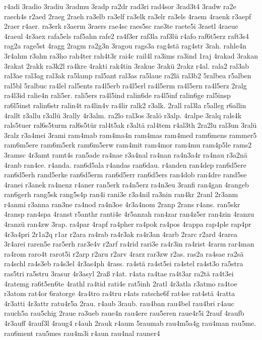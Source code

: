 {r4adi
3radio
3radiu
3radmu
3radp
ra2dr
rad3ri
rad4sor
3rad3t4
3radw
ra2e
raech4s
r2aed
2raeg
2raeh
ra3elb
ra3elf
ra3elk
ra3elr
ra3els
4raem
4raenk
r3aepf
2raer
r4aer.
ra3erk
r3aerm
3raers
rae4sc
raes5sc
rae3te
raete5i
3raetl
4raeue
4raeul
4r3aex
rafa5els
raf5ahn
rafe2
ra4f3er
raf3la
raf3lü
r4afo
raf6t5erz
raft3s4
rag2a
rage5st
4ragg
2ragm
ra2g3n
3ragou
rags3a
rag4stä
rag4str
3rah.
rahle4n
3r4ahm
r3ahn
ra3ho
rah4ter
rah4t3r
rai4c
rail4l
ra3ims
ra3ind
1raj
4rakad
3rakan
3rakat
2rakk
ra3k2l
ra4kre
4rakti
rak4tin
3rakue
3rakü
2rakz
r4al.
rala2
ral3ab
ral3ae
ral3ag
ral3ak
ra5lamp
ral5ant
ral3as
ra5laue
ra2lä
ral3b2
5ralbea
r5alben
ral5bl
5ralbuc
ra4lel
ral5ents
ra4l5erb
ra4l5erl
ra4l5erm
ra4l5ern
ra4l5erz
2ralg
ra4l3id
ralie4n
rali5er.
rali5ers
ra4l5ind
ralin6de
ra4l5inf
ralin6ge
ral5insp
ra6l5inst
ralin6str
ralin4t
ra4lin4v
ra4lir
ralk2
r3alk.
2rall
ral3la
r5alleg
r6allin
4rallt
r3allu
r3allü
3rally
4r3alm.
ra2lo
ral3os
3ralö
r3alp.
4ralpe
3ralq
rals4k
rals5tuer
ral6s5turm
ral6s5tür
ral4t5ak
r3altä
ral4tem
r4al3th
2ra2lu
ral3un
3ralü
3ralz
r3a4mei
3rami
ram4mab
ram4ma4n
ram4mas
ram4med
ram6mens
rammer5
ram6m5ere
ram6m5erk
ram6m5erw
ram4mit
ram4mor
ram4mu
ram4p5le
rams2
3ramsc
4r3amt
ramt4s
ran5ade
ra4nae
r3a4nal
ra4nan
ra4n3a4r
ra4nau
r3a2nä
4ranb
ran4ce.
r4anda.
ran6d5ala
r4andas
ran6dau.
r4anden
ran4dep
ran6d5ere
ran6d5erh
rand5erke
ran6d5erm
ran6d5err
ran6d5ers
ran4dob
ran4dre
rand5se
4ranei
r3anek
ra4nenz
r4aner
ran5erk
ra4n5erz
ra4n3eu
3ranfi
ran4gan
4rangeb
ran6gerh
rang5sk
rang5s4p
ran4i
rani3e
r3a4nil
ra3nin
ran4kr
2ranl
2r3anm
r4anmi
r3anna
ran3ne
ra4nod
ra4n3oe
4r3a4nom
2ranp
2rans
r4ans.
ran5skr
4ransp
ran4spa
4ranst
r5anthr
ranti4e
4r5anzah
ran4zar
ran4z5er
ran4zin
4ranzu
4ranzü
ran4zw
3rap.
ra4par
4rapf
ra4pher
ra4pok
ra4pos
4rappa
rap4ple
rap4pr
4r3a4pri
2r1a2q
r1ar
r2ara
ra4rab
ra4r3ak
ra4r3an
4rarb
2rarc
r2ard
4rarea
3r4arei
raren5e
rar5erh
rar3e4v
r2arf
ra4rid
rari3e
ra4r3in
ra4rist
4rarm
rar4man
ra4rom
raro4t
rarot5i
r2arp
r2aru
r2arv
4rarz
rar3zw
r2as.
ras2a
ra4sae
ra2sä
ra4schl
ra4s3eb
ra4s3el
4r3as4ph
4rass.
ra4stä
ra4st5ei
ra4stel
ra4st3o
ra5stra
ras5tri
ra5stru
3rasur
4r3asyl
2raß
r4at.
r4ata
ra4tae
ra4t3ar
ra2tä
ra4t3ei
4ratemg
ra6t5en6te
4rathl
ra4tid
rati4e
rat5inh
2ratl
4r3atla
r3atmo
ra4toe
r3atom
rat4or
6ratorge
4ra4tro
ra4tru
r4ats
ratsche6f
rat4se
rat4stä
4ratta
4r3atti
4r3attr
ratu4r5a
2rau.
r4aub
3raub.
rau4ban
rau4bel
rau4bri
r4auc
rauch5a
rau5chig
2raue
ra3ueb
raue4n
rau4ere
rau5eren
raue4r5i
2rauf
4raufb
4r3auff
4rauf3l
4raug4
r4auh
2rauk
r4aum
5raumab
rau4m5a4g
rau4man
rau5me.
rau6ment
rau5mes
rau4m3i
r4aun
rau4nal
rauner4
}
